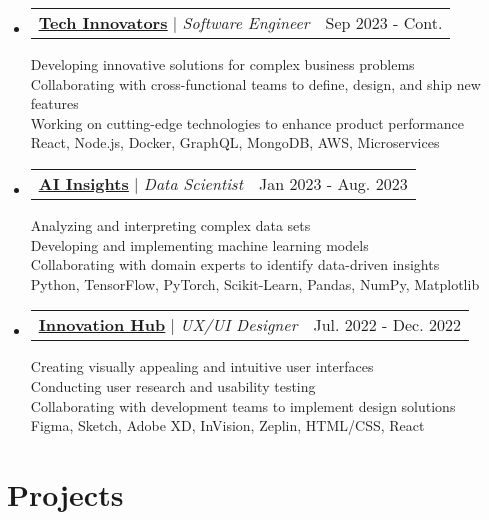\documentclass[letterpaper,11pt]{article}%
\makeatletter
\newcommand{\resumeProjectHeading}[2]{
    \item
    \begin{tabular*}{0.97\textwidth}{l@{\extracolsep{\fill}}r}
      \small#1 & #2 \\
    \end{tabular*}\vspace{-7pt}
}
\newcommand{\resumeSubHeadingListStart}{\begin{itemize}[leftmargin=0.15in, label={}]}
\newcommand{\resumeSubHeadingListEnd}{\end{itemize}}
\makeatother
\begin{document}
%
\resumeSubHeadingListStart%
\resumeProjectHeading{\textbf{\href{https://techinnovators.com/}{\underline{Tech Innovators}}} $|$ \footnotesize\emph{Software Engineer}\vspace{8pt}}{Sep 2023 - Cont.}{\small{Developing innovative solutions for complex business problems}}\\
{\small{Collaborating with cross-functional teams to define, design, and ship new features}}\\
{\small{Working on cutting-edge technologies to enhance product performance}}\\
{\small{React, Node.js, Docker, GraphQL, MongoDB, AWS, Microservices}}%
\resumeProjectHeading{\textbf{\href{https://aiinsights.com/}{\underline{AI Insights}}} $|$ \footnotesize\emph{Data Scientist}\vspace{8pt}}{Jan 2023 - Aug. 2023}{\small{Analyzing and interpreting complex data sets}}\\
{\small{Developing and implementing machine learning models}}\\
{\small{Collaborating with domain experts to identify data-driven insights}}\\
{\small{Python, TensorFlow, PyTorch, Scikit-Learn, Pandas, NumPy, Matplotlib}}%
\resumeProjectHeading{\textbf{\href{}{\underline{Innovation Hub}}} $|$ \footnotesize\emph{UX/UI Designer}\vspace{8pt}}{Jul. 2022 - Dec. 2022}{\small{Creating visually appealing and intuitive user interfaces}}\\
{\small{Conducting user research and usability testing}}\\
{\small{Collaborating with development teams to implement design solutions}}\\
{\small{Figma, Sketch, Adobe XD, InVision, Zeplin, HTML/CSS, React}}%
\resumeSubHeadingListEnd%
\section{Projects}%
\label{sec:Projects}%
\end{document}
